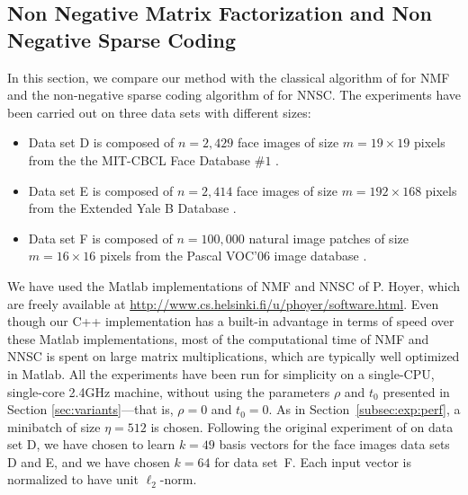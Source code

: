 \documentclass[twoside,11pt]{article}
\begin{document}
\subsection{Non Negative Matrix Factorization and Non Negative Sparse Coding} \label{subsec:exp:nmf}
In this section, we compare our method with the classical algorithm of
\citet{lee2} for NMF and the non-negative sparse coding algorithm of
\citet{hoyer} for NNSC. The experiments have been 
carried out on three data sets with different sizes:
\begin{itemize}
\item Data set D is composed of $n=2, 429$ face images of size $m = 19 \times 19$
   pixels from the the MIT-CBCL Face Database $\# 1$ \citep{sung}.
\item Data set E is composed of $n=2, 414$ face images of size $m= 192 \times 168$
   pixels from the Extended Yale B Database \citep{georghiades,lee3}.
\item Data set F is composed of $n=100, 000$ natural image patches of size $m=16
   \times 16$ pixels from the Pascal VOC'06 image database \citep{pascal2}.
\end{itemize}
We have used the Matlab implementations of NMF and NNSC of P. Hoyer, which are
freely available at \url{http://www.cs.helsinki.fi/u/phoyer/software.html}.
Even though our C++ implementation has a built-in advantage in terms of speed
over these Matlab implementations, most of the computational time of NMF and
NNSC is spent on large matrix multiplications, which are typically well optimized in
Matlab.  All the experiments have been run for simplicity on a
single-CPU, single-core
2.4GHz machine, without using the parameters $\rho$ and $t_0$ presented in
Section \ref{sec:variants}---that is, $\rho=0$ and $t_0=0$.  As in
Section~\ref{subsec:exp:perf}, a minibatch of size $\eta=512$ is chosen.
Following the original experiment of \citet{lee2} on data set D, we have chosen to learn $k=49$ basis vectors for the face images data sets D and E, and we have chosen $k=64$ for data set~F. Each input vector is normalized to
have unit $\ell_2$-norm.
\end{document}
